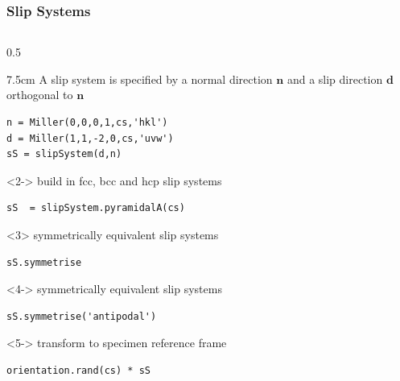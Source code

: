 \documentclass[compress,aspectratio=1610,fleqn]{beamer}
\begin{document}
\begin{frame}[fragile]
  \frametitle{Slip Systems}
    \begin{columns}
      \begin{column}{0.5\textwidth}
          \begin{overlayarea}{\textwidth}{7.5cm}
            A slip system is specified by a normal direction $\mathbf n$ and a
            slip direction $\mathbf d$ orthogonal to $\mathbf n$
            \vspace{-0.2cm}
  \begin{lstlisting}[style=input]
n = Miller(0,0,0,1,cs,'hkl')
d = Miller(1,1,-2,0,cs,'uvw')
sS = slipSystem(d,n)
\end{lstlisting}

\vspace{0.1cm}

  \begin{onlyenv}<2-> build in fcc, bcc and hcp slip systems \vspace{-0.2cm}
\begin{lstlisting}[style=input]
sS  = slipSystem.pyramidalA(cs)
\end{lstlisting}
  \end{onlyenv}

\vspace{0.1cm}

  \begin{onlyenv}<3>
    symmetrically equivalent slip systems
    \vspace{-0.2cm}
        \begin{lstlisting}[style=input]
sS.symmetrise
        \end{lstlisting}
  \end{onlyenv}
  \begin{onlyenv}<4->
    symmetrically equivalent slip systems
    \vspace{-0.2cm}
        \begin{lstlisting}[style=input]
sS.symmetrise('antipodal')
        \end{lstlisting}
  \end{onlyenv}

\vspace{0.1cm}

  \begin{onlyenv}<5->
    transform to specimen reference frame
    \vspace{-0.2cm}
        \begin{lstlisting}[style=input]
orientation.rand(cs) * sS
        \end{lstlisting}
  \end{onlyenv}


\end{overlayarea}
\end{column}
\end{columns}
\end{frame}
\end{document}
